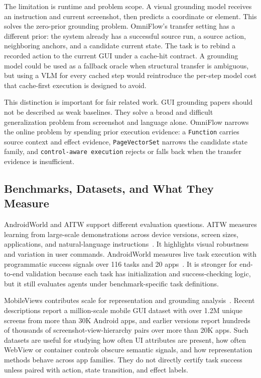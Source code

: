 \documentclass[sigplan,10pt]{acmart}
\newcommand{\sysname}{OmniFlow\xspace}
\begin{document}
The limitation is runtime and problem scope. A visual grounding model receives
an instruction and current screenshot, then predicts a coordinate or element.
This solves the zero-prior grounding problem. \sysname's transfer setting has a
different prior: the system already has a successful source run, a source
action, neighboring anchors, and a candidate current state. The task is to
rebind a recorded action to the current GUI under a cache-hit contract. A
grounding model could be used as a fallback oracle when structural transfer is
ambiguous, but using a VLM for every cached step would reintroduce the per-step
model cost that cache-first execution is designed to avoid.

This distinction is important for fair related work. GUI grounding papers should
not be described as weak baselines. They solve a broad and difficult
generalization problem from screenshot and language alone. \sysname narrows the
online problem by spending prior execution evidence: a \texttt{Function} carries
source context and effect evidence, \texttt{PageVectorSet} narrows the candidate
state family, and \texttt{control-aware execution} rejects or falls back when the
transfer evidence is insufficient.

\subsection{Benchmarks, Datasets, and What They Measure}

AndroidWorld and AITW support different evaluation questions. AITW measures
learning from large-scale demonstrations across device versions, screen sizes,
applications, and natural-language instructions~\cite{rawles2023android}. It
highlights visual robustness and variation in user commands. AndroidWorld
measures live task execution with programmatic success signals over 116 tasks
and 20 apps~\cite{rawles2025androidworld}. It is stronger for end-to-end
validation because each task has initialization and success-checking logic, but
it still evaluates agents under benchmark-specific task definitions.

MobileViews contributes scale for representation and grounding
analysis~\cite{mobileviews}. Recent descriptions report a million-scale mobile
GUI dataset with over 1.2M unique screens from more than 30K Android apps, and
earlier versions report hundreds of thousands of screenshot-view-hierarchy pairs
over more than 20K apps. Such datasets are useful for studying how often UI
attributes are present, how often WebView or container controls obscure semantic
signals, and how representation methods behave across app families. They do not
directly certify task success unless paired with action, state transition, and
effect labels.
\end{document}
